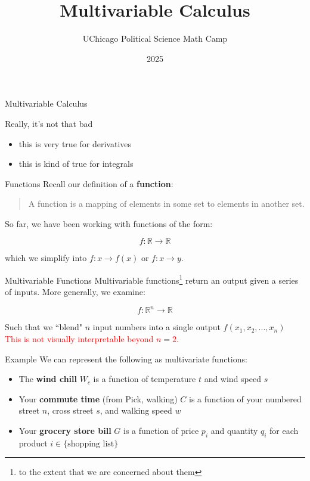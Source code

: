 \documentclass[10pt]{beamer}
\title{Multivariable Calculus}
\author{UChicago Political Science Math Camp}
\institute{Ryan Gibbons \& Luke Cain}
\date{2025}
\begin{document}
\frame{\titlepage}

\begin{frame}{Multivariable Calculus}

Really, it's not that bad
    \begin{itemize}
        \item this is very true for derivatives
        \item this is kind of true for integrals
    \end{itemize}
\end{frame}

\begin{frame}{Functions}
    Recall our definition of a \textbf{function}: \\

    \vspace{1cm}

    \begin{quote}
        A function is a mapping of elements in some set to elements in another set.
    \end{quote}

    So far, we have been working with functions of the form:

    \[f: \mathbb{R} \rightarrow \mathbb{R}\]

    which we simplify into $f: x \rightarrow f(x)$ or $f: x \rightarrow y$.
\end{frame}

\begin{frame}{Multivariable Functions}
    Multivariable functions\footnote{to the extent that we are concerned about them} return an output given a series of inputs. More generally, we examine:

    \[f: \mathbb{R}^n \rightarrow \mathbb{R}\]

    Such that we ``blend" $n$ input numbers into a single output $f(x_1,x_2,...,x_n)$ \\

    \vspace{1cm}
    \textcolor{red}{This is not visually interpretable beyond $n=2$.}
\end{frame}

\begin{frame}{Example}
We can represent the following as multivariate functions:

\begin{itemize}
        \item The \textbf{wind chill} $W_c$ is a function of temperature $t$ and wind speed $s$
        \item Your \textbf{commute time} (from Pick, walking) $C$ is a function of your numbered street $n$, cross street $s$, and walking speed $w$
        \item Your \textbf{grocery store bill} $G$ is a function of price $p_i$ and quantity $q_i$ for each product $i \in \{\text{shopping list}\}$
    \end{itemize}
\end{frame}
\end{document}
